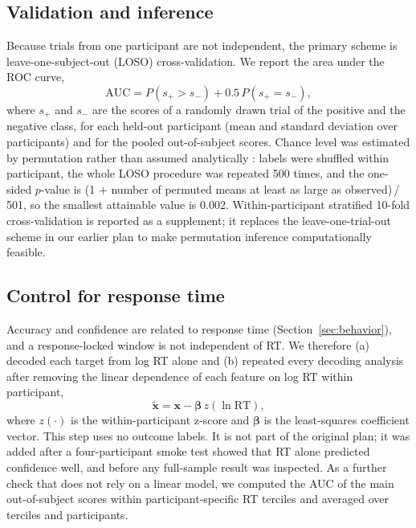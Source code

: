 \documentclass[11pt,a4paper]{article}
\begin{document}
\subsection{Validation and inference}

Because trials from one participant are not independent, the primary scheme is leave-one-subject-out (LOSO) cross-validation. We report the area under the ROC curve,
\begin{equation}
\mathrm{AUC}=P(s_{+}>s_{-})+0.5\,P(s_{+}=s_{-}),
\label{eq:auc}
\end{equation}
where $s_{+}$ and $s_{-}$ are the scores of a randomly drawn trial of the positive and the negative class, for each held-out participant (mean and standard deviation over participants) and for the pooled out-of-subject scores. Chance level was estimated by permutation rather than assumed analytically \cite{r23,r26}: labels were shuffled within participant, the whole LOSO procedure was repeated 500 times, and the one-sided $p$-value is (1 + number of permuted means at least as large as observed)\,/\,501, so the smallest attainable value is 0.002. Within-participant stratified 10-fold cross-validation is reported as a supplement; it replaces the leave-one-trial-out scheme in our earlier plan to make permutation inference computationally feasible.

\subsection{Control for response time}

Accuracy and confidence are related to response time (Section~\ref{sec:behavior}), and a response-locked window is not independent of RT. We therefore (a) decoded each target from log RT alone and (b) repeated every decoding analysis after removing the linear dependence of each feature on log RT within participant,
\begin{equation}
\tilde{\mathbf{x}}=\mathbf{x}-\boldsymbol{\beta}\,z(\ln\mathrm{RT}),
\label{eq:resid}
\end{equation}
where $z(\cdot)$ is the within-participant z-score and $\boldsymbol{\beta}$ is the least-squares coefficient vector. This step uses no outcome labels. It is not part of the original plan; it was added after a four-participant smoke test showed that RT alone predicted confidence well, and before any full-sample result was inspected. As a further check that does not rely on a linear model, we computed the AUC of the main out-of-subject scores within participant-specific RT terciles and averaged over terciles and participants.
\end{document}

